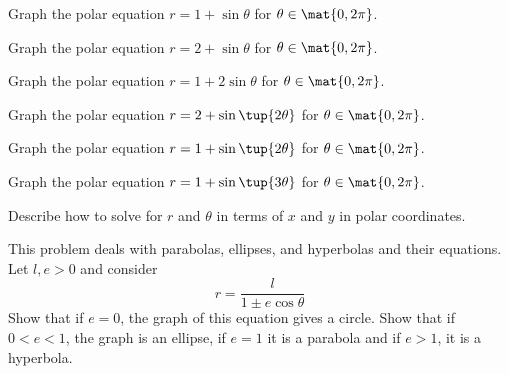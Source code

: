 \begin{enumialphparenastyle}
\begin{ex} Graph the polar equation $r=1+\sin \theta $ for $\theta \in \mat{0,2\pi}$.
\end{ex}

\begin{ex} Graph the polar equation $r=2+\sin \theta $ for $\theta \in \mat{0,2\pi}$.
\end{ex}

\begin{ex} Graph the polar equation $r=1+2\sin \theta $ for $\theta \in \mat{0,2\pi}$.
\end{ex}

\begin{ex} Graph the polar equation $r=2+\sin \tup{2\theta } $ for $\theta \in \mat{0,2\pi 
}$.
\end{ex}

\begin{ex} Graph the polar equation $r=1+\sin \tup{2\theta } $ for $\theta \in \mat{0,2\pi 
}$.
\end{ex}

\begin{ex} Graph the polar equation $r=1+\sin \tup{3\theta } $ for $\theta \in \mat{0,2\pi 
} $.
\end{ex}


\begin{ex} Describe how to solve for $r$ and $\theta $ in terms of $x$ and $y$ in polar
coordinates.
\end{ex}

\begin{ex} This problem deals with parabolas, ellipses, and
hyperbolas and their equations. Let $l,e>0$ and consider
\begin{equation*}
r=\frac{l}{1\pm e\cos \theta }
\end{equation*}
Show that if $e=0$, the graph of this equation gives a circle. Show that if $0<e<1$, the graph is an ellipse, if $e=1$
it is a parabola and if $e>1$, it is a hyperbola.
\end{ex}

\end{enumialphparenastyle}